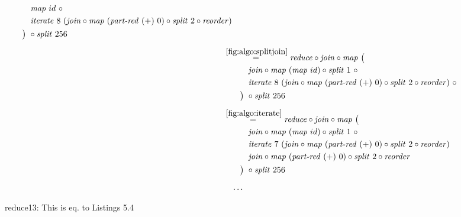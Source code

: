 \begin{figure*}[t]
\begin{align*}
\begin{aligned}
    &\qquad\quad\map\ id\ \circ \\
    &\qquad\quad\iterateN\ 8\ (\join \circ \map\ (\partRed\ (+)\ 0) \circ \splitN\ 2\circ \reorder)\\
    &\qquad\big)\ \circ \splitN\ 256
  \end{aligned}\\[.5em]
%
  &\hspace{-2em}\quad\begin{aligned}
    &\overset{\ref{fig:algo:splitjoin}}{=\hspace{.2em}}
      \reduce \circ \join \circ \map\ \big(\\
    &\qquad\quad\join \circ \map\ (\map\ id) \circ \splitN\ 1\ \circ\\
    &\qquad\quad\iterateN\ 8\ (\join \circ \map\ (\partRed\ (+)\ 0) \circ \splitN\ 2\circ \reorder)\ \circ\\
    &\qquad\big)\ \circ \splitN\ 256
  \end{aligned}\\[.5em]
%
  &\hspace{-2em}\quad\begin{aligned}
    &\overset{\ref{fig:algo:iterate}}{=\hspace{.2em}}
      \reduce \circ \join \circ \map\ \big(\\
    &\qquad\quad\join \circ \map\ (\map\ id) \circ \splitN\ 1\ \circ\\
    &\qquad\quad\iterateN\ 7\ (\join \circ \map\ (\partRed\ (+)\ 0) \circ \splitN\ 2\circ \reorder)\\
    &\qquad\quad\join \circ \map\ (\partRed\ (+)\ 0) \circ \splitN\ 2\circ \reorder\\
    &\qquad\big)\ \circ \splitN\ 256
  \end{aligned}\\[.5em]
%
  &\ldots
\end{align*}
\caption{reduce13: This is eq. to Listings 5.4}
\end{figure*}

